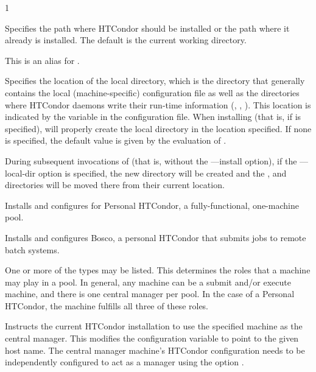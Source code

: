 \begin{ManPage}{\label{man-condor-configure}}{1}
\begin{Options}
   {Specifies the path
    where HTCondor should be installed or the path where it already is
    installed. The default is the current working directory.}

   {This is an alias for
    .}

   {Specifies the
    location of the local directory, which is the directory that generally 
    contains the local (machine-specific) configuration file as well as the
    directories where HTCondor daemons write their run-time information 
    (, , ).
    This location is indicated  by the  
    variable in the configuration file. 
    When installing (that is, if  is specified),
    will properly create the local directory in the location specified.
    If none is specified, the default value is given by the evaluation of
    .

    During subsequent invocations of 
    (that is, without the ---install option),
    if the ---local-dir option is specified, the new directory
    will be created and the ,  and  
    directories will be moved there from their current location.}

   {Installs and configures for 
     Personal HTCondor, a fully-functional, one-machine pool.}

   {Installs and configures Bosco, a personal
     HTCondor that submits jobs to remote batch systems.}

   {One
    or more of the types may be listed.
    This determines the roles that a machine may play in a pool.
    In general, any machine can be a submit and/or execute machine,
    and there is one central manager per pool.
    In the case of a Personal HTCondor,
    the machine fulfills all three of these roles.}

   {Instructs
    the current HTCondor installation to use the specified machine
    as the central manager. 
    This modifies the configuration variable 
    to point to the given host name.
    The central manager machine's HTCondor configuration needs
    to be independently configured to 
    act as a manager using the option . }


\end{Options}
\end{ManPage}
